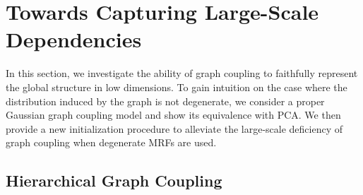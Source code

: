 \section{Towards Capturing Large-Scale Dependencies}\label{sec:towards_large_scale}

In this section, we investigate the ability of graph coupling to faithfully represent the global structure in low dimensions. To gain intuition on the case where the distribution induced by the graph is not degenerate, we consider a proper Gaussian graph coupling model and show its equivalence with PCA. We then provide a new initialization procedure to alleviate the large-scale deficiency of graph coupling when degenerate MRFs are used.

\subsection{Hierarchical Graph Coupling}\label{sec:hierarchical_modelling}

